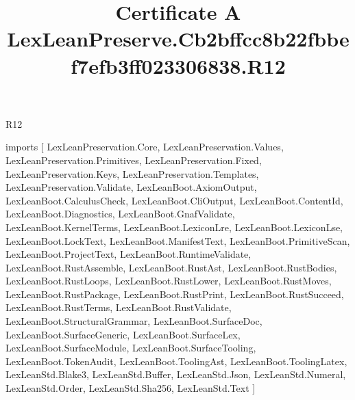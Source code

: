 \begin{lexlean}{R12}
\title{Certificate A LexLeanPreserve.Cb2bffcc8b22fbbef7efb3ff023306838.R12}
\begin{coremodule}
imports [
  LexLeanPreservation.Core,
  LexLeanPreservation.Values,
  LexLeanPreservation.Primitives,
  LexLeanPreservation.Fixed,
  LexLeanPreservation.Keys,
  LexLeanPreservation.Templates,
  LexLeanPreservation.Validate,
  LexLeanBoot.AxiomOutput,
  LexLeanBoot.CalculusCheck,
  LexLeanBoot.CliOutput,
  LexLeanBoot.ContentId,
  LexLeanBoot.Diagnostics,
  LexLeanBoot.GnafValidate,
  LexLeanBoot.KernelTerms,
  LexLeanBoot.LexiconLre,
  LexLeanBoot.LexiconLse,
  LexLeanBoot.LockText,
  LexLeanBoot.ManifestText,
  LexLeanBoot.PrimitiveScan,
  LexLeanBoot.ProjectText,
  LexLeanBoot.RuntimeValidate,
  LexLeanBoot.RustAssemble,
  LexLeanBoot.RustAst,
  LexLeanBoot.RustBodies,
  LexLeanBoot.RustLoops,
  LexLeanBoot.RustLower,
  LexLeanBoot.RustMoves,
  LexLeanBoot.RustPackage,
  LexLeanBoot.RustPrint,
  LexLeanBoot.RustSucceed,
  LexLeanBoot.RustTerms,
  LexLeanBoot.RustValidate,
  LexLeanBoot.StructuralGrammar,
  LexLeanBoot.SurfaceDoc,
  LexLeanBoot.SurfaceGeneric,
  LexLeanBoot.SurfaceLex,
  LexLeanBoot.SurfaceModule,
  LexLeanBoot.SurfaceTooling,
  LexLeanBoot.TokenAudit,
  LexLeanBoot.ToolingAst,
  LexLeanBoot.ToolingLatex,
  LexLeanStd.Blake3,
  LexLeanStd.Buffer,
  LexLeanStd.Json,
  LexLeanStd.Numeral,
  LexLeanStd.Order,
  LexLeanStd.Sha256,
  LexLeanStd.Text
]


\end{coremodule}
\end{lexlean}
